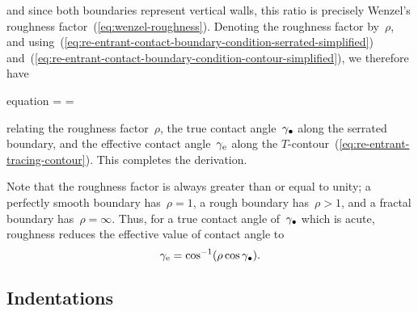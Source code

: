 and since both boundaries represent vertical walls,
this ratio is precisely Wenzel's roughness factor~(\ref{eq:wenzel-roughness}).
Denoting the roughness factor by~$\rho$,
and using~(\ref{eq:re-entrant-contact-boundary-condition-serrated-simplified})
and~(\ref{eq:re-entrant-contact-boundary-condition-contour-simplified}),
we therefore have
\begin{important}{equation}
  \rho =  = \frac{\cos\gamma_\eff}{\cos\gamma_\tr}
  \label{eq:roughness-cosine-ratio}
\end{important}
relating the roughness factor~$\rho$,
the true contact angle~$\gamma_\bullet$ along the serrated boundary,
and the effective contact angle~$\gamma_{\mathrm{e}}$
along the $T$-contour~(\ref{eq:re-entrant-tracing-contour}).
This completes the derivation.

Note that the roughness factor is always greater than or equal to unity;
a perfectly smooth boundary has~$\rho = 1$,
a rough boundary has~$\rho > 1$,
and a fractal boundary has~$\rho = \infty$.
Thus, for a true contact angle of~$\gamma_\bullet$ which is acute,
roughness reduces the effective value of contact angle to
\begin{equation}
  \gamma_\eff = \cos^{-1} \roundbr*{\rho \cos\gamma_\tr}.
  \label{eq:effective-contact-angle}
\end{equation}

\subsection{Indentations}
\label{sec:re-entrant.dip-coating.indentations}

\begin{figure}
\end{figure}

